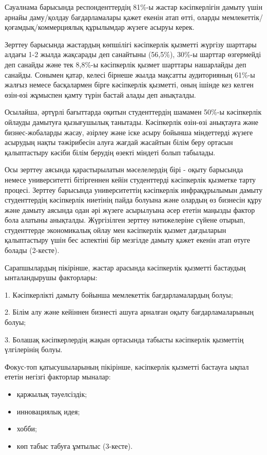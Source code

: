 \begin{multicols}{2}
Сауалнама барысында респонденттердің 81\%-ы жастар кәсіпкерлігін дамыту
үшін арнайы даму/қолдау бағдарламалары қажет екенін атап өтті, оларды
мемлекеттік/қоғамдық/коммерциялық құрылымдар жүзеге асыруы керек.

Зерттеу барысында жастардың көпшілігі кәсіпкерлік қызметті жүргізу
шарттары алдағы 1-2 жылда жақсарады деп санайтыны (56,5\%), 30\%-ы
шарттар өзгермейді деп санайды және тек 8,8\%-ы кәсіпкерлік қызмет
шарттары нашарлайды деп санайды. Сонымен қатар, келесі бірнеше жылда
мақсатты аудиторияның 61\%-ы жалғыз немесе басқалармен бірге кәсіпкерлік
қызметті, оның ішінде кез келген өзін-өзі жұмыспен қамту түрін бастай
алады деп анықталды.

Осылайша, әртүрлі бағыттарда оқитын студенттердің шамамен 50\%-ы
кәсіпкерлік ойлауды дамытуға қызығушылық танытады. Кәсіпкерлік өзін-өзі
анықтауға және бизнес-жобаларды жасау, әзірлеу және іске асыру бойынша
міндеттерді жүзеге асырудың нақты тәжірибесін алуға жағдай жасайтын
білім беру ортасын қалыптастыру кәсіби білім берудің өзекті міндеті
болып табылады.

Осы зерттеу аясында қарастырылатын мәселелердің бірі - оқыту барысында
немесе университетті бітіргеннен кейін студенттерді кәсіпкерлік қызметке
тарту процесі. Зерттеу барысында университеттің кәсіпкерлік
инфрақұрылымын дамыту студенттердің кәсіпкерлік ниетінің пайда болуына
және олардың өз бизнесін құру және дамыту аясында одан әрі жүзеге
асырылуына әсер ететін маңызды фактор бола алатыны анықталды.
Жүргізілген зерттеу нәтижелеріне сүйене отырып, студенттерде
экономикалық ойлау мен кәсіпкерлік қызмет дағдыларын қалыптастыру үшін
бес аспектіні бір мезгілде дамыту қажет екенін атап өтуге болады
(2-кесте).

Сарапшылардың пікірінше, жастар арасында кәсіпкерлік қызметті бастаудың
ынталандырушы факторлары:

  1. Кәсіпкерлікті дамыту бойынша мемлекеттік бағдарламалардың болуы;

  2. Білім алу және кейіннен бизнесті ашуға арналған оқыту
  бағдарламаларының болуы;

  3. Болашақ кәсіпкерлердің жақын ортасында табысты кәсіпкерлік қызметтің
  үлгілерінің болуы.

Фокус-топ қатысушыларының пікірінше, кәсіпкерлік қызметті бастауға ықпал
ететін негізгі факторлар мыналар:

\begin{itemize}
\item
  қаржылық тәуелсіздік;
\item
  инновациялық идея;
\item
  хобби;
\item
  көп табыс табуға ұмтылыс (3-кесте).
\end{itemize}
\end{multicols}

